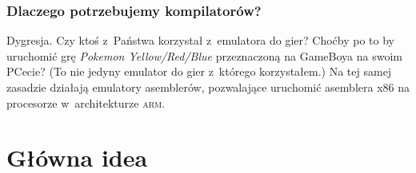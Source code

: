 \documentclass[10pt,t]{beamer}
\begin{document}
\begin{frame}
  \frametitle{Dlaczego potrzebujemy kompilatorów?}

  \pause




  \alert{Dygresja.} Czy ktoś z~Państwa korzystał z~emulatora do gier?
  Choćby po to by uruchomić grę \textit{Pokemon Yellow/Red/Blue}
  przeznaczoną na GameBoya na swoim PCecie? (To nie jedyny emulator do gier
  z~którego korzystałem.) Na tej samej zasadzie działają emulatory
  asemblerów, pozwalające uruchomić asemblera x86 na procesorze
  w~architekturze \textsc{arm}.

\end{frame}





































\section{Główna idea}
\end{document}
